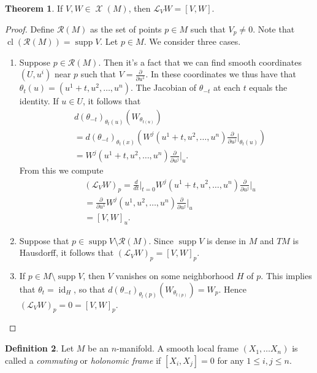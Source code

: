 \documentclass[10pt,letterpaper,cm]{nupset}
\theoremstyle{definition}
\newtheorem{definition}{Definition}[subsection]
\theoremstyle{theorem}
\newtheorem{theorem}[definition]{Theorem}
\theoremstyle{remark}
\newcommand{\1}{\mathbf{1}}
\newcommand{\0}{\vec 0}
\DeclareMathOperator{\id}{id}
\DeclareMathOperator{\supp}{supp}
\DeclareMathOperator{\cl}{cl}
\DeclareMathOperator{\vf}{\mathscr{X}}
\begin{document}
\begin{theorem}
If $V, W\in \vf(M)$, then $\mathcal{L}_VW = [V, W]$.
\end{theorem}
\begin{proof}
Define $\mathcal{R}(M)$ as the set of points $p\in M$ such that $V_p\ne 0$. Note that $\cl(\mathcal{R}(M)) = \supp V$. Let $p\in M$. We consider three cases.
\begin{enumerate}
\item Suppose $p\in \mathcal{R}(M)$. Then it's a fact that we can find smooth coordinates $(U, u^i)$ near $p$ such that $V= \frac{\partial}{\partial{u^1}}$. In these coordinates we thus have that $\theta_t(u) = (u^1 +t, u^2, \ldots, u^n)$. The Jacobian of ${\theta_{-t}}$ at each $t$ equals the identity. If $u\in U$, it follows that
\begin{align*}
& d(\theta_{-t})_{\theta_t(u)}(W_{\theta_{t(u)}})
\\ & = d(\theta_{-t})_{\theta_t(x)} \left(W^j(u^1 + t, u^2, \ldots, u^n)\frac{\partial}{\partial{u^j}}\rvert_{\theta_t(u)}\right)
\\ & = W^j(u^1 + t, u^2, \ldots, u^n)\frac{\partial}{\partial{u^j}}\rvert_{u}.
\end{align*}
From this we compute
\begin{align*}
& (\mathcal{L}_VW)_p= \frac{d}{dt}\rvert_{t=0} W^j(u^1 + t, u^2, \ldots, u^n)\frac{\partial}{\partial{u^j}}\rvert_{u}
\\ & = \frac{\partial}{\partial{u^1}}W^j(u^1 , u^2, \ldots, u^n)\frac{\partial}{\partial{u^j}}\rvert_{u}
\\ & = [V, W]_u
.\end{align*}
\item Suppose that $p\in \supp V \setminus \mathcal{R}(M)$. Since $\supp V$ is dense in $M$ and $TM$ is Hausdorff, it follows that $(\mathcal{L}_VW)_p = [V, W]_p$.
\item If $p\in  M\setminus \supp V$, then $V$ vanishes on some neighborhood $H$ of $p$. This implies that $\theta_t = \id_H$, so that $d(\theta_{-t})_{\theta_t(p)}(W_{\theta_{t(p)}}) = W_p$. Hence $(\mathcal{L}_VW)_p =0 = [V, W]_p$.
\end{enumerate}
\end{proof}

\begin{definition}
Let $M$ be an $n$-manifold. A smooth local frame $(X_1, \ldots X_n)$ is called a \textit{commuting} or \textit{holonomic frame} if $[X_i, X_j]=0$ for any $1\leq i,j\leq n$.
\end{definition}
\end{document}
